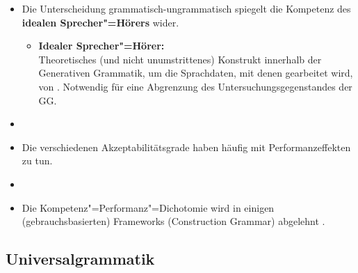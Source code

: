 \begin{frame}

\begin{itemize}

	\item Die Unterscheidung grammatisch-ungrammatisch spiegelt die Kompetenz des \textbf{idealen Sprecher"=Hörers} wider.
	\begin{itemize}
		\item [\ras] \textbf{Idealer Sprecher"=Hörer:}\\
			Theoretisches (und nicht unumstrittenes) Konstrukt innerhalb der Generativen Grammatik, um die Sprachdaten, mit denen gearbeitet wird, von . Notwendig für eine Abgrenzung des Untersuchungsgegenstandes der GG. \citep[vgl.][]{Fries16b}
	\end{itemize}
\item []
	\item Die verschiedenen Akzeptabilitätsgrade haben häufig mit Performanzeffekten zu tun.
	\item []
	\item Die Kompetenz"=Performanz"=Dichotomie wird in einigen (gebrauchsbasierten) Frameworks (\zB Construction Grammar) abgelehnt \citep[vgl.][]{MuellerS15b, Nolda&Co14a}. 
\end{itemize}

\end{frame}


\subsection{Universalgrammatik}


